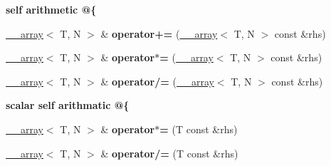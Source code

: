 \begin{Indent}{\bf self arithmetic @\{}\par
\begin{DoxyCompactItemize}
\item 
\hypertarget{class____array_a1fdacdb2b2a79effe9a11121648a3f44}{\hyperlink{class____array}{\-\_\-\-\_\-array}$<$ T, N $>$ \& {\bfseries operator+=} (\hyperlink{class____array}{\-\_\-\-\_\-array}$<$ T, N $>$ const \&rhs)}\label{class____array_a1fdacdb2b2a79effe9a11121648a3f44}

\item 
\hypertarget{class____array_a5b698b219ec8e62bab83528564caa579}{\hyperlink{class____array}{\-\_\-\-\_\-array}$<$ T, N $>$ \& {\bfseries operator$\ast$=} (\hyperlink{class____array}{\-\_\-\-\_\-array}$<$ T, N $>$ const \&rhs)}\label{class____array_a5b698b219ec8e62bab83528564caa579}

\item 
\hypertarget{class____array_af812f20cd83b4f54cb4b0e780ed07b11}{\hyperlink{class____array}{\-\_\-\-\_\-array}$<$ T, N $>$ \& {\bfseries operator/=} (\hyperlink{class____array}{\-\_\-\-\_\-array}$<$ T, N $>$ const \&rhs)}\label{class____array_af812f20cd83b4f54cb4b0e780ed07b11}

\end{DoxyCompactItemize}
\end{Indent}
\begin{Indent}{\bf scalar self arithmatic @\{}\par
\begin{DoxyCompactItemize}
\item 
\hypertarget{class____array_abf242f49019b906d3f846fc185cc38ae}{\hyperlink{class____array}{\-\_\-\-\_\-array}$<$ T, N $>$ \& {\bfseries operator$\ast$=} (T const \&rhs)}\label{class____array_abf242f49019b906d3f846fc185cc38ae}

\item 
\hypertarget{class____array_ad0a349749a91dc7379c626dc13b6f26c}{\hyperlink{class____array}{\-\_\-\-\_\-array}$<$ T, N $>$ \& {\bfseries operator/=} (T const \&rhs)}\label{class____array_ad0a349749a91dc7379c626dc13b6f26c}

\end{DoxyCompactItemize}
\end{Indent}
